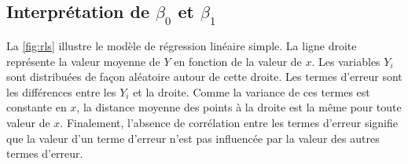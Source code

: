 \subsection{Interprétation de $\beta_0$ et $\beta_1$}
\label{sec:Interprétation}


La \autoref{fig:rls} illustre le modèle de régression linéaire simple. La ligne droite représente la valeur moyenne de $Y$ en fonction de la valeur de $x$. Les variables $Y_i$ sont distribuées de façon aléatoire autour de cette droite. Les termes d'erreur sont les différences entre les $Y_i$ et la droite. Comme la variance de ces termes est constante en $x$, la distance moyenne des points à la droite est la même pour toute valeur de $x$. Finalement, l'absence de corrélation entre les termes d'erreur
signifie que la valeur d'un terme d'erreur n'est pas influencée par la valeur des autres termes d'erreur.

